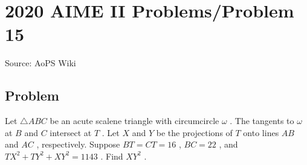 \documentclass[12pt]{article}
\begin{document}
\section*{{2020 AIME II Problems/Problem 15}}
Source: AoPS Wiki

\subsection*{Problem}
Let $\triangle ABC$ be an acute scalene triangle with circumcircle $\omega$ . The tangents to $\omega$ at $B$ and $C$ intersect at $T$ . Let $X$ and $Y$ be the projections of $T$ onto lines $AB$ and $AC$ , respectively. Suppose $BT = CT = 16$ , $BC = 22$ , and $TX^2 + TY^2 + XY^2 = 1143$ . Find $XY^2$ .
\end{document}

